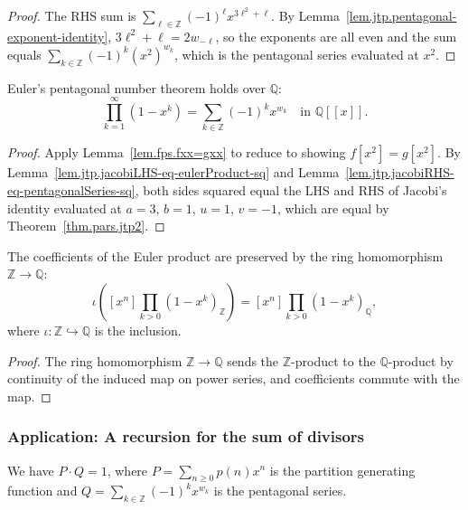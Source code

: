 \begin{proof}
The RHS sum is $\sum_{\ell\in\mathbb{Z}}(-1)^{\ell}x^{3\ell^{2}+\ell}$.
By Lemma~\ref{lem.jtp.pentagonal-exponent-identity},
$3\ell^{2}+\ell=2w_{-\ell}$, so the exponents are all even and the
sum equals $\sum_{k\in\mathbb{Z}}(-1)^{k}(x^{2})^{w_{k}}$, which is
the pentagonal series evaluated at $x^{2}$.
\end{proof}

\begin{lemma}
\label{lem.jtp.euler-pentagonal-rat}
\leanhelper
\leanok
Euler's pentagonal number theorem holds over $\mathbb{Q}$:
\[
\prod_{k=1}^{\infty}(1-x^k) = \sum_{k\in\mathbb{Z}}(-1)^k x^{w_k}
\quad\text{in } \mathbb{Q}[[x]].
\]
\end{lemma}

\begin{proof}
Apply Lemma~\ref{lem.fps.fxx=gxx} to reduce to showing $f[x^2] = g[x^2]$.
By Lemma~\ref{lem.jtp.jacobiLHS-eq-eulerProduct-sq} and
Lemma~\ref{lem.jtp.jacobiRHS-eq-pentagonalSeries-sq}, both sides squared equal the
LHS and RHS of Jacobi's identity evaluated at $a=3$, $b=1$, $u=1$, $v=-1$,
which are equal by Theorem~\ref{thm.pars.jtp2}.
\end{proof}

\begin{lemma}
\label{lem.jtp.eulerProduct-coeff-map}
\leanhelper
\leanok
The coefficients of the Euler product are preserved by the ring homomorphism
$\mathbb{Z}\to\mathbb{Q}$:
\[
\iota\left([x^n]\prod_{k>0}(1-x^k)_{\mathbb{Z}}\right)
= [x^n]\prod_{k>0}(1-x^k)_{\mathbb{Q}},
\]
where $\iota:\mathbb{Z}\hookrightarrow\mathbb{Q}$ is the inclusion.
\end{lemma}

\begin{proof}
The ring homomorphism $\mathbb{Z}\to\mathbb{Q}$ sends the $\mathbb{Z}$-product to
the $\mathbb{Q}$-product by continuity of the induced map on power series, and
coefficients commute with the map.
\end{proof}

\subsubsection{Application: A recursion for the sum of divisors}

\begin{lemma}
\label{lem.jtp.partitionGenFun-mul-pentagonalSeries}
\leanhelper
\leanok
We have $P\cdot Q = 1$, where $P=\sum_{n\geq 0}p(n)x^{n}$ is the
partition generating function and
$Q=\sum_{k\in\mathbb{Z}}(-1)^{k}x^{w_{k}}$ is the pentagonal series.
\end{lemma}

